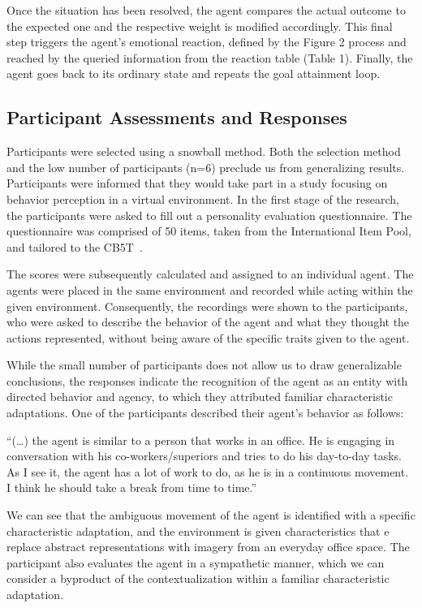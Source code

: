 Once the situation has been resolved, the agent compares the actual outcome to the expected one and the respective weight is modified accordingly. This final step triggers the agent’s emotional reaction, defined by the Figure 2 process and reached by the queried information from the reaction table (Table 1). Finally, the agent goes back to its ordinary state and repeats the goal attainment loop.

\subsection{Participant Assessments and Responses}

Participants were selected using a snowball method. Both the selection method and the low number of participants (n=6) preclude us from generalizing results. Participants were informed that they would take part in a study focusing on behavior perception in a virtual environment. In the first stage of the research, the participants were asked to fill out a personality evaluation questionnaire. The questionnaire was comprised of 50 items, taken from the International Item Pool, and tailored to the CB5T~.

The scores were subsequently calculated and assigned to an individual agent. The agents were placed in the same environment and recorded while acting within the given environment. Consequently, the recordings were shown to the participants, who were asked to describe the behavior of the agent and what they thought the actions represented, without being aware of the specific traits given to the agent.

While the small number of participants does not allow us to draw generalizable conclusions, the responses indicate the recognition of the agent as an entity with directed behavior and agency, to which they attributed familiar characteristic adaptations. One of the participants described their agent’s behavior as follows:

\begin{retQuestion}{}
   “(…) the agent is similar to a person that works in an office. He is engaging in conversation with his co-workers/superiors and tries to do his day-to-day tasks. As I see it, the agent has a lot of work to do, as he is in a continuous movement. I think he should take a break from time to time.”
\end{retQuestion}

We can see that the ambiguous movement of the agent is identified with a specific characteristic adaptation, and the environment is given characteristics that e replace abstract representations with imagery from an everyday office space. The participant also evaluates the agent in a sympathetic manner, which we can consider a byproduct of the contextualization within a familiar characteristic adaptation.

